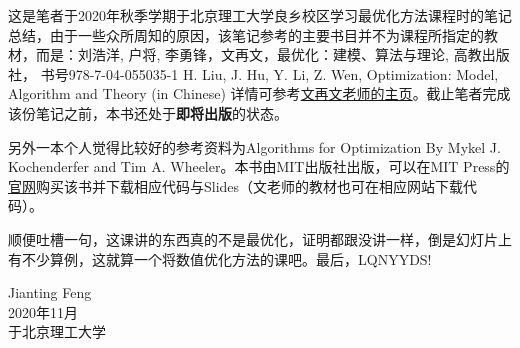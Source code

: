 这是笔者于2020年秋季学期于北京理工大学良乡校区学习最优化方法课程时的笔记总结，由于一些众所周知的原因，该笔记参考的主要书目并不为课程所指定的教材，而是：刘浩洋, 户将, 李勇锋，文再文，最优化：建模、算法与理论, 高教出版社， 书号978-7-04-055035-1
H. Liu, J. Hu, Y. Li, Z. Wen, Optimization: Model, Algorithm and Theory (in Chinese)
详情可参考\href{http://bicmr.pku.edu.cn/~wenzw/optbook.html}{文再文老师的主页}。截止笔者完成该份笔记之前，本书还处于\textbf{即将出版}的状态。\par
另外一本个人觉得比较好的参考资料为Algorithms for Optimization
By Mykel J. Kochenderfer and Tim A. Wheeler。本书由MIT出版社出版，可以在MIT Press的\href{https://mitpress.mit.edu/books/algorithms-optimization}{官网}购买该书并下载相应代码与Slides（文老师的教材也可在相应网站下载代码）。
\par
顺便吐槽一句，这课讲的东西真的不是最优化，证明都跟没讲一样，倒是幻灯片上有不少算例，这就算一个将数值优化方法的课吧。最后，LQNYYDS!
\par
\bigskip
Jianting Feng\\
2020年11月\\
于北京理工大学